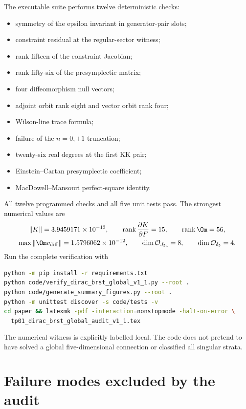 The executable suite performs twelve deterministic checks:
\begin{itemize}
\item symmetry of the epsilon invariant in generator-pair slots;
\item constraint residual at the regular-sector witness;
\item rank fifteen of the constraint Jacobian;
\item rank fifty-six of the presymplectic matrix;
\item four diffeomorphism null vectors;
\item adjoint orbit rank eight and vector orbit rank four;
\item Wilson-line trace formula;
\item failure of the $n=0,\pm1$ truncation;
\item twenty-six real degrees at the first KK pair;
\item Einstein--Cartan presymplectic coefficient;
\item MacDowell--Mansouri perfect-square identity.
\end{itemize}
All twelve programmed checks and all five unit tests pass.  The strongest numerical values are
\[
\begin{gathered}
\|K\|=3.9459171\times10^{-13},
\qquad
\operatorname{rank}\frac{\partial K}{\partial F}=15,
\qquad
\operatorname{rank}\Om=56,\\
\max\|\Om v_{\rm diff}\|=1.5796062\times10^{-12},
\qquad
\dim\mathcal O_{J_{54}}=8,
\qquad
\dim\mathcal O_{\delta_5}=4.
\end{gathered}
\]
Run the complete verification with
\begin{lstlisting}[language=bash]
python -m pip install -r requirements.txt
python code/verify_dirac_brst_global_v1_1.py --root .
python code/generate_summary_figures.py --root .
python -m unittest discover -s code/tests -v
cd paper && latexmk -pdf -interaction=nonstopmode -halt-on-error \
  tp01_dirac_brst_global_audit_v1_1.tex
\end{lstlisting}
The numerical witness is explicitly labelled local.  The code does not pretend to have solved a global five-dimensional connection or classified all singular strata.

\section{Failure modes excluded by the audit}

